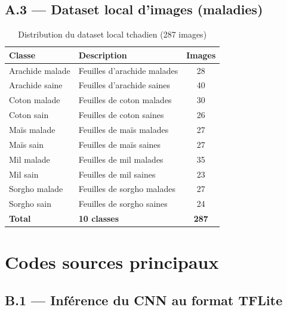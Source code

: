 \section*{A.3 --- Dataset local d'images (maladies)}

\begin{table}[H]
	\centering
	\caption{Distribution du dataset local tchadien (287 images)}
	\label{tab:ann_mal}
	\begin{tabularx}{\textwidth}{lXc}
		\toprule
		\textbf{Classe} & \textbf{Description} & \textbf{Images} \\
		\midrule
		Arachide malade  & Feuilles d'arachide malades  & 28 \\
		Arachide saine   & Feuilles d'arachide saines   & 40 \\
		Coton malade     & Feuilles de coton malades    & 30 \\
		Coton sain       & Feuilles de coton saines     & 26 \\
		Maïs malade      & Feuilles de maïs malades     & 27 \\
		Maïs sain        & Feuilles de maïs saines      & 27 \\
		Mil malade       & Feuilles de mil malades      & 35 \\
		Mil sain         & Feuilles de mil saines       & 23 \\
		Sorgho malade    & Feuilles de sorgho malades   & 27 \\
		Sorgho sain      & Feuilles de sorgho saines    & 24 \\
		\midrule
		\textbf{Total}   & \textbf{10 classes}          & \textbf{287} \\
		\bottomrule
	\end{tabularx}
\end{table}

\chapter{Codes sources principaux}
\label{ann:codes}

\section*{B.1 --- Inférence du CNN au format TFLite}

